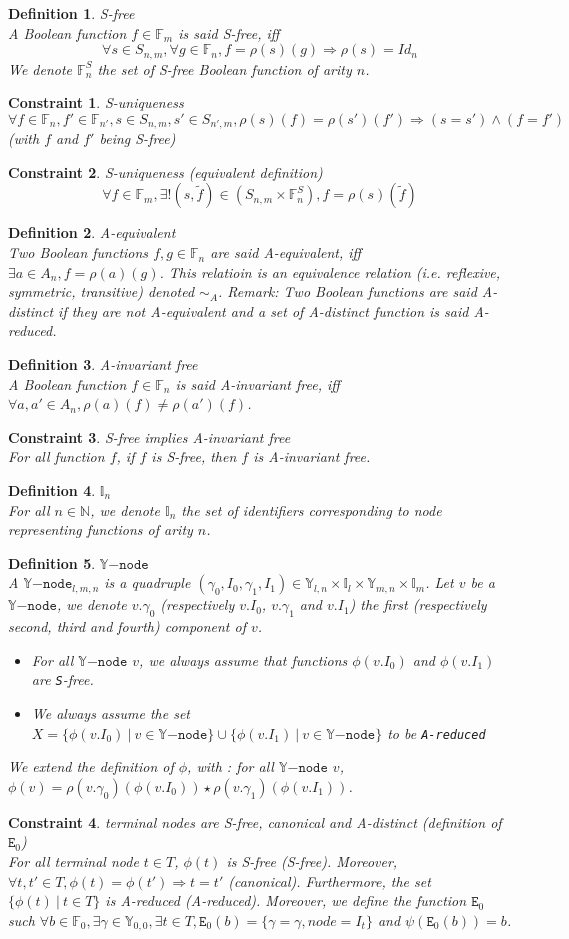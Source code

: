 \documentclass[a4paper,10pt]{article}
\newcommand{\N}{\mathbb{N}}%
\newcommand{\F}{\mathbb{F}}
\newcommand{\Y}{\mathbb{Y}}
\newcommand{\I}{\mathbb{I}}
\newcommand{\Ynode}{\Y\mathtt{-node}}
\newtheorem{newdef}{Definition}
\newcommand{\definition}[2]{\begin{newdef}{#1\\}#2\end{newdef}}
\newtheorem{newcons}{Constraint}
\newcommand{\constraint}[2]{\begin{newcons}{#1\\}#2\end{newcons}}
\begin{document}
\definition{S-free}
{
A Boolean function $f\in\F_m$ is said S-free, iff
\[\forall s \in S_{n, m}, \forall g \in \F_n, f = \rho(s)(g) \Rightarrow \rho(s) = Id_n\]
We denote $\F^S_n$ the set of S-free Boolean function of arity $n$.
}

\constraint{S-uniqueness}
{
\[\forall f\in\F_n, f'\in\F_{n'}, s\in S_{n, m}, s'\in S_{n', m}, \rho(s)(f) = \rho(s')(f') \Rightarrow (s = s') \land (f = f')\]
(with $f$ and $f'$ being S-free)
}

\constraint{S-uniqueness (equivalent definition)}
{
\[\forall f\in\F_m, \exists! (s, \tilde{f})\in \left( S_{n, m} \times \F^S_n \right), f = \rho(s)(\tilde{f})\]
}

\definition{A-equivalent}
{
Two Boolean functions $f, g\in\F_n$ are said A-equivalent, iff $\exists a\in A_n, f = \rho(a)(g)$.
This relatioin is an equivalence relation (i.e. reflexive, symmetric, transitive) denoted $\sim_A$.
Remark: Two Boolean functions are said A-distinct if they are not A-equivalent and a set of A-distinct function is said A-reduced.
}

\definition{A-invariant free}
{
A Boolean function $f\in\F_n$ is said A-invariant free, iff $\forall a, a'\in A_n, \rho(a)(f) \neq \rho(a')(f)$.
}

\constraint{S-free implies A-invariant free}
{For all function $f$, if $f$ is S-free, then $f$ is A-invariant free.}


\definition{$\I_n$}
{
For all $n\in\N$, we denote $\I_n$ the set of identifiers corresponding to node representing functions of arity $n$.
}

\definition{$\Ynode$}
{A $\Ynode_{l, m, n}$ is a quadruple $(\gamma_0, I_0, \gamma_1, I_1) \in \Y_{l, n} \times \I_l \times \Y_{m, n} \times \I_m$. Let $v$ be a $\Ynode$, we denote $v.\gamma_0$ (respectively $v.I_0$, $v.\gamma_1$ and $v.I_1$) the first (respectively second, third and fourth) component of $v$.
\begin{itemize}
\item For all $\Ynode$ $v$, we always assume that functions $\phi(v.I_0)$ and $\phi(v.I_1)$ are \texttt{S}-free.
\item We always assume the set $X = \{\phi(v.I_0) ~|~ v \in\Ynode\} \cup \{\phi(v.I_1) ~|~ v\in\Ynode\}$ to be \texttt{A-reduced}
\end{itemize}
We extend the definition of $\phi$, with : for all $\Ynode$ $v$, $\phi(v) = \rho(v.\gamma_0)(\phi(v.I_0)) \star \rho(v.\gamma_1)(\phi(v.I_1))$.
}

\constraint{terminal nodes are S-free, canonical and A-distinct (definition of $\mathtt{E}_0$)}
{For all terminal node $t \in T$, $\phi(t)$ is S-free (S-free).
Moreover, $\forall t, t' \in T, \phi(t) = \phi(t') \Rightarrow t = t'$ (canonical).
Furthermore, the set $\{\phi(t) ~|~ t\in T\}$ is A-reduced (A-reduced).
Moreover, we define the function $\mathtt{E}_0$ such $\forall b\in\F_0, \exists \gamma\in\Y_{0, 0}, \exists t\in T, \mathtt{E}_0(b) = \{\gamma = \gamma, node = I_t\}$ and $\psi(\mathtt{E}_0(b)) = b$.
}
\end{document}
